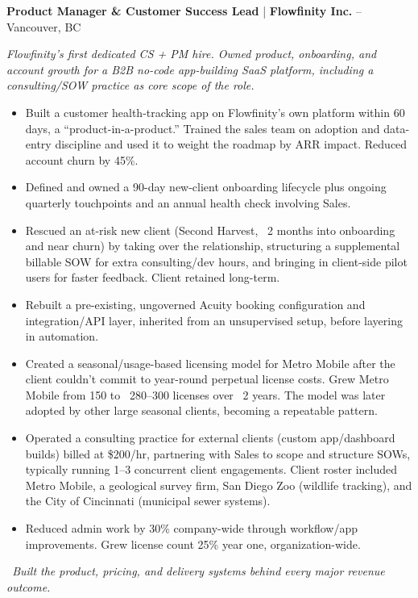 \documentclass[11pt,a4paper,sans]{moderncv}
\renewcommand*{\labelitemi}{}
\newcommand{\cvoneline}[4]{%
  \noindent\textbf{#1} \normalfont | \textbf{#2} -- #3%
  \ifthenelse{\equal{#4}{}}{}{\hfill#4}%
  \par\vspace{1pt}%
}
\newcommand{\bulletitemize}{\renewcommand*{\labelitemi}{\strut\textcolor{color1}{\textbullet}}}
\newcommand{\insight}[1]{\vspace{2pt}\par{\small\itshape\color{lightbulbyellow}\faIcon{lightbulb}\color{color1}\ #1}}
\begin{document}
\vspace{\baselineskip}

\cvoneline{Product Manager \& Customer Success Lead}{Flowfinity Inc.}{Vancouver, BC}{Mar 2017--Apr 2020}
\textit{Flowfinity's first dedicated CS + PM hire. Owned product, onboarding, and account growth for a B2B no-code app-building SaaS platform, including a consulting/SOW practice as core scope of the role.}
{\bulletitemize
\begin{itemize}
    \item Built a customer health-tracking app on Flowfinity's own platform within 60 days, a ``product-in-a-product.'' Trained the sales team on adoption and data-entry discipline and used it to weight the roadmap by ARR impact. Reduced account churn by 45\%.
    \item Defined and owned a 90-day new-client onboarding lifecycle plus ongoing quarterly touchpoints and an annual health check involving Sales.
    \item Rescued an at-risk new client (Second Harvest, ~2 months into onboarding and near churn) by taking over the relationship, structuring a supplemental billable SOW for extra consulting/dev hours, and bringing in client-side pilot users for faster feedback. Client retained long-term.
    \item Rebuilt a pre-existing, ungoverned Acuity booking configuration and integration/API layer, inherited from an unsupervised setup, before layering in automation.
    \item Created a seasonal/usage-based licensing model for Metro Mobile after the client couldn't commit to year-round perpetual license costs. Grew Metro Mobile from 150 to ~280--300 licenses over ~2 years. The model was later adopted by other large seasonal clients, becoming a repeatable pattern.
    \item Operated a consulting practice for external clients (custom app/dashboard builds) billed at \$200/hr, partnering with Sales to scope and structure SOWs, typically running 1--3 concurrent client engagements. Client roster included Metro Mobile, a geological survey firm, San Diego Zoo (wildlife tracking), and the City of Cincinnati (municipal sewer systems).
    \item Reduced admin work by 30\% company-wide through workflow/app improvements. Grew license count 25\% year one, organization-wide.
\end{itemize}}
\insight{Built the product, pricing, and delivery systems behind every major revenue outcome.}
\end{document}
